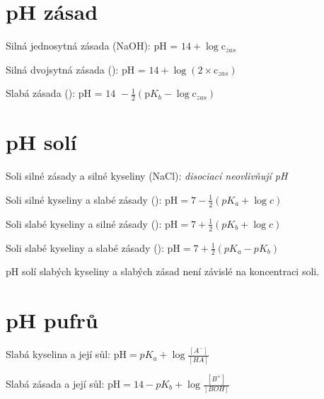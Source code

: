 \documentclass[a4paper]{article}
\begin{document}
{\section*{pH zásad}
\begin{compactitem}
	\item Silná jednosytná zásada (NaOH): $\textrm{pH = }14 + \log \textrm{c}_{zas}$
	\item Silná dvojsytná zásada (): $\textrm{pH = }14 + \log (2\times \textrm{c}_{zas})$
	\item Slabá zásada (): $\textrm{pH = 14 } - \frac{1}{2}(\textrm{p}K_b - \log \textrm{c}_{zas})$
\end{compactitem}

\section*{pH solí}
\begin{compactitem}
	\item Soli silné zásady a silné kyseliny (NaCl): \emph{disociací neovlivňují pH}
	\item Soli silné kyseliny a slabé zásady (): $\textrm{pH} = 7 - \frac{1}{2}(pK_a + \log c)$
	\item Soli slabé kyseliny a silné zásady (): $\textrm{pH} = 7 + \frac{1}{2}(pK_b + \log c)$
	\item Soli slabé kyseliny a slabé zásady (): $\textrm{pH} = 7 + \frac{1}{2}(pK_a - pK_b)$
	\begin{compactitem}
		\item pH solí slabých kyseliny a slabých zásad není závislé na koncentraci soli.
	\end{compactitem}
\end{compactitem}

\section*{pH pufrů}
\begin{compactitem}
	\item Slabá kyselina a její sůl: $\textrm{pH} = pK_a + \log\frac{[A^-]}{[HA]}$
	\item Slabá zásada a její sůl: $\textrm{pH} = 14 - pK_b + \log\frac{[B^+]}{[BOH]}$
\end{compactitem}



}
\end{document}
